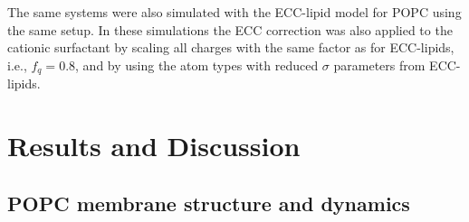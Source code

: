 \documentclass[aip,jcp,twocolumn]{revtex4}
\begin{document}
The same systems were also simulated with the ECC-lipid model for POPC using the same setup. 
In these simulations the ECC correction was also applied to the cationic surfactant 
by scaling all charges with the same factor as for ECC-lipids, i.e., $f_q=0.8$, 
and by using the atom types with reduced $\sigma$ parameters from ECC-lipids. 


\section{Results and Discussion}

\subsection{POPC membrane structure and dynamics}
\end{document}
